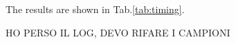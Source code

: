 \documentclass[a4paper,twoside,12pt]{article}
\begin{document}
The results are shown in Tab.\ref{tab:timing}.

HO PERSO IL LOG, DEVO RIFARE I CAMPIONI\\
\end{document}
